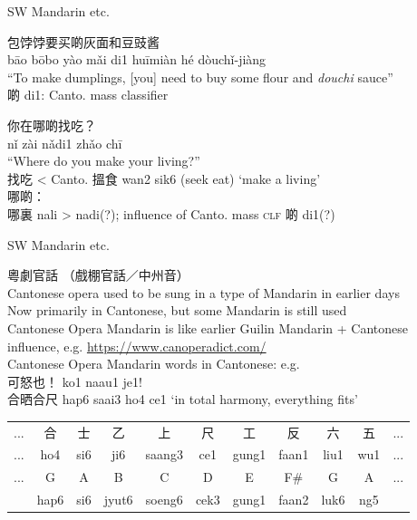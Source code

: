 \documentclass{beamer}
\begin{document}
\begin{frame}[fragile]{SW Mandarin etc.}

包饽饽要买啲灰面和豆豉酱\\
bāo bōbo yào mǎi di1 huīmiàn hé dòuchǐ-jiàng\\
\enquote{To make dumplings, [you] need to buy some flour and \textit{douchi} sauce}\\

\medskip
啲 di1: Canto. mass classifier

\bigskip
你在哪啲找吃？\\
nǐ zài nǎdi1 zhǎo chī\\
\enquote{Where do you make your living?}\\

\medskip
找吃 < Canto. 搵食 wan2 sik6 (seek eat) \enquote*{make a living}\\
哪啲：\\哪裏 nali > nadi(?); influence of Canto. mass \textsc{clf} 啲 di1(?)\\ 

\end{frame}

\begin{frame}[fragile]{SW Mandarin etc.}

粵劇官話 （戲棚官話／中州音）\\
Cantonese opera used to be sung in a type of Mandarin in earlier days\\
Now primarily in Cantonese, but some Mandarin is still used\\
\medskip 
Cantonese Opera Mandarin is like earlier Guilin Mandarin + Cantonese influence, e.g. \url{https://www.canoperadict.com/}\\
\medskip
Cantonese Opera Mandarin words in Cantonese: e.g.\\
可怒也！ ko1 naau1 je1!\\
合晒合尺 hap6 saai3 ho4 ce1 {\footnotesize \enquote*{in total harmony, everything fits}}\\

\bigskip
{\footnotesize
\begin{tabular}{c c c c c c c c c c c}
    ... & 合 & 士 & 乙 & 上 & 尺 & 工 & 反 & 六 & 五 & ... \\
    ... & ho4 & si6 & ji6 & saang3 & ce1 & gung1 & faan1 & liu1 & wu1 & ...\\
    ... & G & A & B & C & D & E & F\# & G & A & ...\\
    & \textcolor{black!40}{hap6} & \textcolor{black!40}{si6} & \textcolor{black!40}{jyut6} & \textcolor{black!40}{soeng6} & \textcolor{black!40}{cek3} & \textcolor{black!40}{gung1} & \textcolor{black!40}{faan2} & \textcolor{black!40}{luk6} & \textcolor{black!40}{ng5} & \\
\end{tabular}}

\end{frame}
\end{document}
